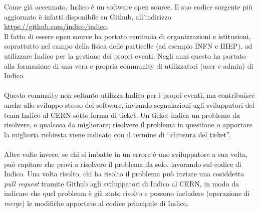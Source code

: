 		Come già accennato,  Indico è un software open source. Il suo codice sorgente più aggiornato è infatti disponibile su Github, all'indirizzo \url{https://github.com/indico/indico}.\\
		Il fatto di essere open source ha portato centinaia di organizzazioni e istituzioni, soprattutto nel campo della fisica delle particelle (ad esempio \acs{INFN} e \acs{IHEP}), ad utilizzare Indico per la gestione dei propri eventi. Negli anni questo ha portato alla formazione di una vera e propria community di utilizzatori (user e admin) di Indico.\\
		\\
		Questa commuity non soltanto utilizza Indico per i propri eventi, ma contribuisce anche allo sviluppo stesso del software,  inviando segnalazioni agli sviluppatori del team Indico  al \ac{CERN} sotto forma di ticket. Un ticket indica un problema da risolvere, o qualcosa da migliorare; risolvere il problema in questione o apportare la miglioria richiesta viene indicato con il termine di ``chiusura del ticket''.\\
		\\
		Altre volte invece, se chi si imbatte in un errore è uno sviluppatore a sua volta, può capitare che provi a risolvere il problema da solo, lavorando sul codice di Indico. Una volta  risolto, chi ha risolto il problema può inviare una cosiddetta \textit{pull request} tramite Github agli sviluppatori di Indico al \ac{CERN}, in modo da indicare che  quel  problema è già stato risolto e possono includere (operazione di \textit{merge}) le modifiche apportate al codice principale di Indico.
	